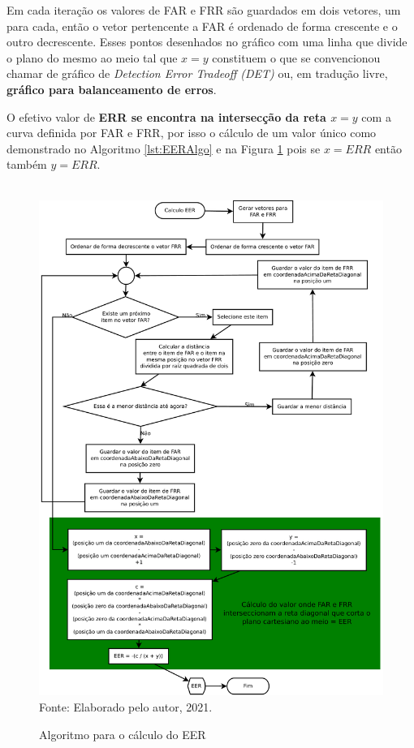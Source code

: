 		\par Em cada iteração os valores de FAR e FRR são guardados em dois vetores, um para cada, então o vetor pertencente a FAR é ordenado de forma crescente e o outro decrescente. Esses pontos desenhados no gráfico com uma linha que divide o plano do mesmo ao meio tal que $x=y$ constituem o que se convencionou chamar de gráfico de \textit{Detection Error Tradeoff (DET)} ou, em tradução livre, \textbf{gráfico para balanceamento de erros}.\\
		
		\par O efetivo valor de \textbf{ERR se encontra na intersecção da reta $x=y$} com a curva definida por FAR e FRR, por isso o cálculo de um valor único como demonstrado no Algoritmo \ref{lst:EERAlgo} e na Figura \ref{fig:eeralgo} pois se $x=ERR$ então também $y=ERR$.\\\\
	
		

		\begin{figure}[H]
			\centering
			\caption{Algoritmo para o cálculo do EER}
			\includegraphics[width=1\linewidth]{images/EERAlgo.pdf}
			\label{fig:eeralgo}
			\\Fonte: Elaborado pelo autor, 2021.
		\end{figure}
	
